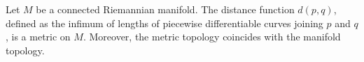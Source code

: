 Let $M$ be a connected Riemannian manifold. The distance function $d(p, q)$, defined as the infimum of lengths of piecewise differentiable curves joining $p$ and $q$, is a metric on $M$. Moreover, the metric topology coincides with the manifold topology.